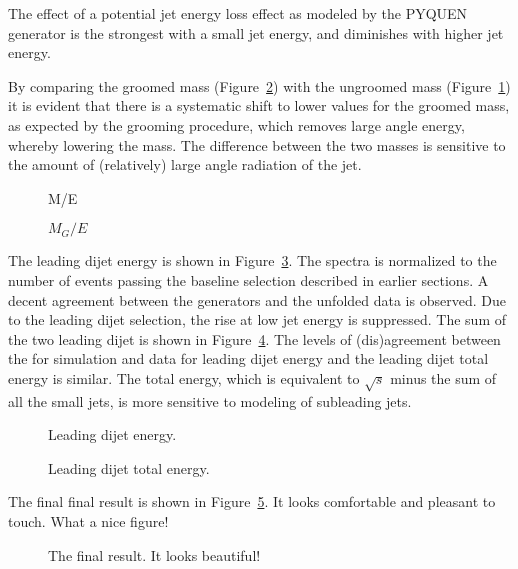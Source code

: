 The effect of a potential jet energy loss effect as modeled by the PYQUEN generator is the strongest with a small jet energy, and diminishes with higher jet energy.

By comparing the groomed mass (Figure~\ref{Figure:Result-JetMGE}) with the ungroomed mass (Figure~\ref{Figure:Result-JetME}) it is evident that there is a systematic shift to lower values for the groomed mass, as expected by the grooming procedure, which removes large angle energy, whereby lowering the mass.  The difference between the two masses is sensitive to the amount of (relatively) large angle radiation of the jet.

\begin{figure}[htp!]
    \centering
    \caption{M/E}
    \label{Figure:Result-JetME}
\end{figure}

\begin{figure}[htp!]
    \centering
    \caption{$M_G/E$}
    \label{Figure:Result-JetMGE}
\end{figure}

\clearpage

The leading dijet energy is shown in Figure~\ref{Figure:Result-DiJetE}.  The spectra is normalized to the number of events passing the baseline selection described in earlier sections.  A decent agreement between the generators and the unfolded data is observed.  Due to the leading dijet selection, the rise at low jet energy is suppressed.  The sum of the two leading dijet is shown in Figure~\ref{Figure:Result-DiJetSumE}.  The levels of (dis)agreement between the for simulation and data for leading dijet energy and the leading dijet total energy is similar.  The total energy, which is equivalent to $\sqrt{s}$ minus the sum of all the small jets, is more sensitive to modeling of subleading jets.

\begin{figure}[htp!]
    \centering
    \caption{Leading dijet energy.}
    \label{Figure:Result-DiJetE}
\end{figure}

\begin{figure}[htp!]
    \centering
    \caption{Leading dijet total energy.}
    \label{Figure:Result-DiJetSumE}
\end{figure}

\clearpage

The final final result is shown in Figure~\ref{Figure:Result-FinalResult}.  It looks comfortable and pleasant to touch.  What a nice figure!

\begin{figure}[htp!]
    \centering
    \caption{The final result.  It looks beautiful!}
    \label{Figure:Result-FinalResult}
\end{figure}

\clearpage



